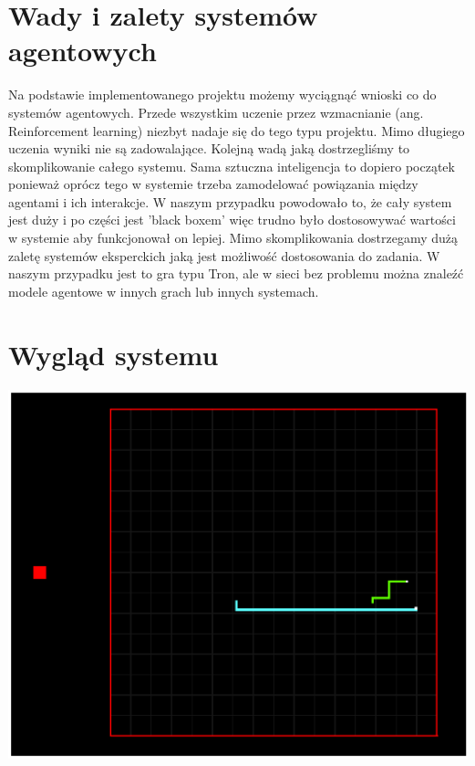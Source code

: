 \documentclass[12pt,a4paper]{article}
\begin{document}
\section{Wady i zalety systemów agentowych}
Na podstawie implementowanego projektu możemy wyciągnąć wnioski co do systemów agentowych. Przede wszystkim uczenie przez wzmacnianie (ang. Reinforcement learning) niezbyt nadaje się do tego typu projektu. Mimo długiego uczenia wyniki nie są zadowalające. Kolejną wadą jaką dostrzegliśmy to skomplikowanie całego systemu. Sama sztuczna inteligencja to dopiero początek ponieważ oprócz tego w systemie trzeba zamodelować powiązania między agentami i ich interakcje. W naszym przypadku powodowało to, że cały system jest duży i po części jest 'black boxem' więc trudno było dostosowywać wartości w systemie aby funkcjonował on lepiej. Mimo skomplikowania dostrzegamy dużą zaletę systemów eksperckich jaką jest możliwość dostosowania do zadania. W naszym przypadku jest to gra typu Tron, ale w sieci bez problemu można znaleźć modele agentowe w innych grach lub innych systemach. 

\section{Wygląd systemu}
\includegraphics[scale=0.8]{media/Wyglad1}
\end{document}
